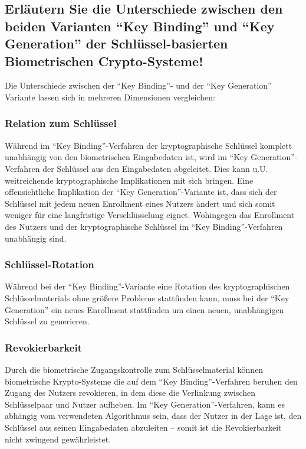 \documentclass{article}
\begin{document}
\subsection{Erläutern Sie die Unterschiede zwischen den beiden Varianten ``Key Binding'' und ``Key Generation''
der Schlüssel-basierten Biometrischen Crypto-Systeme!}



Die Unterschiede zwischen der ``Key Binding''- und der ``Key Generation'' Variante lassen sich in mehreren Dimensionen vergleichen:

\subsubsection*{Relation zum Schlüssel}

Während im ``Key Binding''-Verfahren der kryptographische Schlüssel komplett unabhängig von den biometrischen Eingabedaten ist, wird
im ``Key Generation''-Verfahren der Schlüssel aus den Eingabedaten abgeleitet. Dies kann u.U. weitreichende kryptographische 
Implikationen mit sich bringen. Eine offensichtliche Implikation der ``Key Generation''-Variante ist, dass sich der Schlüssel mit jedem 
neuen Enrollment eines Nutzers ändert und sich somit weniger für eine langfristige Verschlüsselung eignet. Wohingegen das Enrollment
des Nutzers und der kryptographische Schlüssel im ``Key Binding''-Verfahren unabhängig sind.

\subsubsection*{Schlüssel-Rotation}

Während bei der ``Key Binding''-Variante eine Rotation des kryptographischen Schlüsselmaterials ohne größere Probleme stattfinden kann,
muss bei der ``Key Generation'' ein neues Enrollment stattfinden um einen neuen, unabhängigen Schlüssel zu generieren.

\subsubsection*{Revokierbarkeit}

Durch die biometrische Zugangskontrolle zum Schlüsselmaterial können biometrische Krypto-Systeme die auf dem ``Key Binding''-Verfahren 
beruhen den Zugang des Nutzers revokieren, in dem diese die Verlinkung zwischen Schlüsselpaar und Nutzer aufheben. Im ``Key 
Generation''-Verfahren, kann es abhängig vom verwendeten Algorithmus sein, dass der Nutzer in der Lage ist, den Schlüssel aus seinen 
Eingabedaten abzuleiten – somit ist die Revokierbarkeit nicht zwingend gewährleistet.
\end{document}
